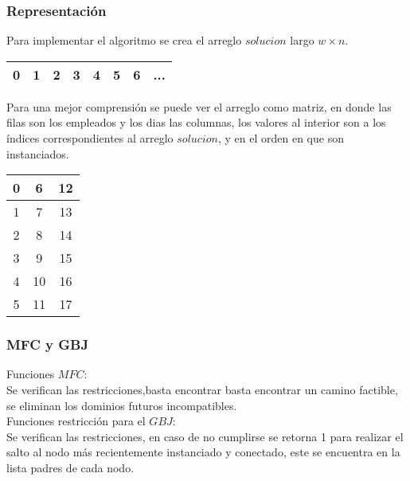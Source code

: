 \frame
{
\frametitle{Representación}
Para implementar el algoritmo se crea el arreglo $solucion$ largo $w \times n$.\\
\begin{table}[H]
\begin{center}
\begin{tabular}{|c|c|c|c|c|c|c|c|}
\hline  0& 1 & 2&3&4&5&6&...  \\ 
\hline 
\end{tabular} 
\end{center}
\end{table}

Para una mejor comprensión se puede ver el arreglo como matriz, en donde las filas son los empleados y los dias las columnas, los valores al interior son a los índices correspondientes al arreglo $solucion$, y en el orden en que son instanciados.
\begin{table}[H]
\begin{center}
\begin{tabular}{|c|c|c|}
\hline  0& 6 & 12  \\ 
\hline  1& 7& 13 \\ 
\hline  2& 8 & 14  \\ 
\hline  3&9 & 15\\ 
\hline  4& 10 & 16  \\ 
\hline  5& 11& 17  \\ 
\hline 
\end{tabular} 
\end{center}
\end{table}
}
\frame
{
\frametitle{MFC y GBJ}
Funciones $MFC$:\\
Se verifican las restricciones,basta encontrar basta encontrar un camino factible, se eliminan los dominios futuros incompatibles.\\ \vspace{14 pt}
Funciones restricción para el $GBJ$:\\
Se verifican las restricciones, en caso de no cumplirse se retorna 1 para realizar el salto al nodo más recientemente instanciado y conectado, este se encuentra en la lista padres de cada nodo.\\

}

